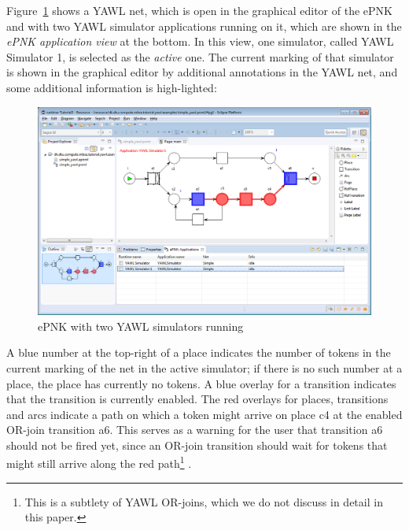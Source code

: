 \documentclass[a4paper]{llncs}
\begin{document}
Figure~\ref{fig:YAWLsim2} shows a YAWL net, which is open in the graphical
editor of the ePNK and with two YAWL simulator applications running on it, which are shown in the 
\emph{ePNK application view} at the bottom. In this view, one simulator, called YAWL Simulator 1,
is selected as the \emph{active} one. The current marking of that simulator is shown in the graphical
editor by additional annotations in the YAWL net, and some additional information is high-lighted:
%
\begin{figure}[tb!!]
  \centerline{\includegraphics[scale=.29]{ePNK-yawl-sim2}}
  \caption{ePNK with two YAWL simulators running}
  \label{fig:YAWLsim2}
\end{figure}
%
A blue number at the top-right of a place indicates the number of
tokens in the current marking of the net in the active simulator; if there is
no such number at a place, the place has currently no tokens.
A blue overlay for a transition indicates that the transition is 
currently enabled. The red overlays for places, transitions and arcs indicate
a path on which a token might arrive on place {\sf c4} at the enabled
OR-join transition {\sf a6}.
This serves as a warning for the user that transition {\sf a6} should not be fired yet,
since an OR-join transition should wait for tokens that might still arrive along the
red path\footnote
{This is a subtlety of YAWL OR-joins, which we do not discuss in detail in this paper.}%
.
\end{document}
